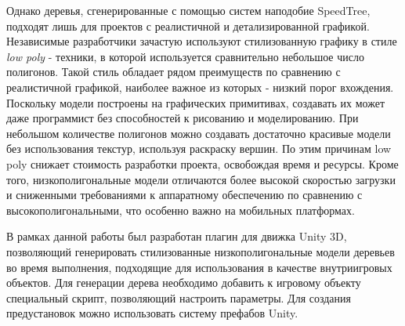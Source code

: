 Однако деревья, сгенерированные с помощью систем наподобие SpeedTree, подходят лишь для проектов с реалистичной и детализированной графикой. Независимые разработчики зачастую используют стилизованную графику в стиле \emph{low poly} - техники, в которой используется сравнительно небольшое число полигонов. Такой стиль обладает рядом преимуществ по сравнению с реалистичной графикой, наиболее важное из которых - низкий порог вхождения. Поскольку модели построены на графических примитивах, создавать их может даже программист без способностей к рисованию и моделированию. При небольшом количестве полигонов можно создавать достаточно красивые модели без использования текстур, используя раскраску вершин. По этим причинам low poly снижает стоимость разработки проекта, освобождая время и ресурсы. Кроме того, низкополигональные модели отличаются более высокой скоростью загрузки и сниженными требованиями к аппаратному обеспечению по сравнению с высокополигональными, что особенно важно на мобильных платформах. \cite{LowPolyIntro} 

В рамках данной работы был разработан плагин для движка Unity 3D, позволяющий генерировать стилизованные низкополигональные модели деревьев во время выполнения, подходящие для использования в качестве внутриигровых объектов. Для генерации дерева необходимо добавить к игровому объекту специальный скрипт, позволяющий настроить параметры. Для создания предустановок можно использовать систему префабов Unity.
 
\newpage
